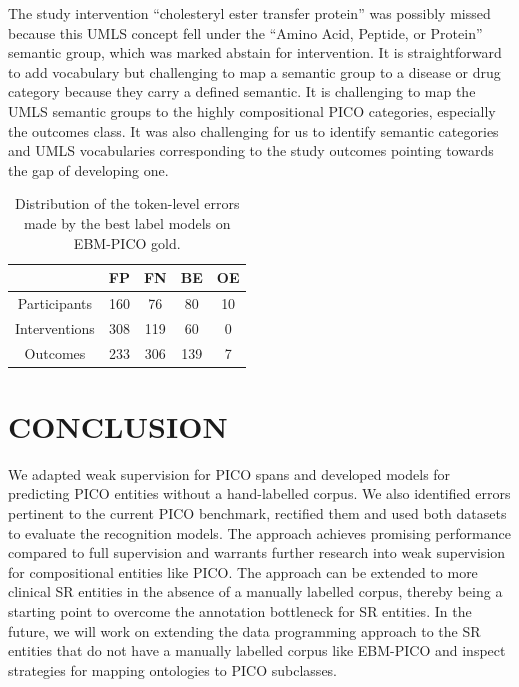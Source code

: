 \documentclass[10.7pt,]{article}
\begin{document}
The study intervention ``cholesteryl ester transfer protein'' was possibly missed because this UMLS concept fell under the ``Amino Acid, Peptide, or Protein'' semantic group, which was marked abstain for intervention.
It is straightforward to add vocabulary but challenging to map a semantic group to a disease or drug category because they carry a defined semantic.
It is challenging to map the UMLS semantic groups to the highly compositional PICO categories, especially the outcomes class.
It was also challenging for us to identify semantic categories and UMLS vocabularies corresponding to the study outcomes pointing towards the gap of developing one.
%
\begin{table}[h!]
\begin{center}
\begin{tabular}{| c | c | c | c | c |} 
\hline
 & FP & FN & BE & OE \\ 
\hline
Participants & 160 & 76 & 80 & 10 \\ 
Interventions & 308 & 119 & 60 & 0 \\ 
Outcomes & 233 & 306 & 139 & 7 \\ 
\hline
\end{tabular}
\caption{\label{tab:error_ner} Distribution of the token-level errors made by the best label models on EBM-PICO gold.}
\end{center}
\end{table}
%
%
%
\section{CONCLUSION}\label{conclusion}
%
We adapted weak supervision for PICO spans and developed models for predicting PICO entities without a hand-labelled corpus.
We also identified errors pertinent to the current PICO benchmark, rectified them and used both datasets to evaluate the recognition models.
The approach achieves promising performance compared to full supervision and warrants further research into weak supervision for compositional entities like PICO.
The approach can be extended to more clinical SR entities in the absence of a manually labelled corpus, thereby being a starting point to overcome the annotation bottleneck for SR entities.
In the future, we will work on extending the data programming approach to the SR entities that do not have a manually labelled corpus like EBM-PICO and inspect strategies for mapping ontologies to PICO subclasses.
%
%
%
\end{document}
